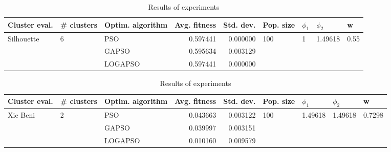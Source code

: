 \documentclass{article}
\begin{document}
\begin{table}
\centering
\caption{Results of experiments}
\begin{tabular}{lllrrllll}
\toprule
              Cluster eval. &        \# clusters & Optim. algorithm &  Avg. fitness &  Std. dev. &            Pop. size &         $\phi_{1}$ &               $\phi_{2}$ &                     w \\
\midrule
\multirow{3}{*}{Silhouette} & \multirow{3}{*}{6} &              PSO &      0.597441 &   0.000000 & \multirow{3}{*}{100} & \multirow{3}{*}{1} & \multirow{3}{*}{1.49618} & \multirow{3}{*}{0.55} \\
                            &                    &            GAPSO &      0.595634 &   0.003129 &                      &                    &                          &                       \\
                            &                    &          LOGAPSO &      0.597441 &   0.000000 &                      &                    &                          &                       \\
\bottomrule
\end{tabular}
\end{table}
\begin{table}
\centering
\caption{Results of experiments}
\begin{tabular}{lllrrllll}
\toprule
            Cluster eval. &        \# clusters & Optim. algorithm &  Avg. fitness &  Std. dev. &            Pop. size &               $\phi_{1}$ &               $\phi_{2}$ &                       w \\
\midrule
\multirow{3}{*}{Xie Beni} & \multirow{3}{*}{2} &              PSO &      0.043663 &   0.003122 & \multirow{3}{*}{100} & \multirow{3}{*}{1.49618} & \multirow{3}{*}{1.49618} & \multirow{3}{*}{0.7298} \\
                          &                    &            GAPSO &      0.039997 &   0.003151 &                      &                          &                          &                         \\
                          &                    &          LOGAPSO &      0.010160 &   0.009579 &                      &                          &                          &                         \\
\bottomrule
\end{tabular}
\end{table}
\end{document}

